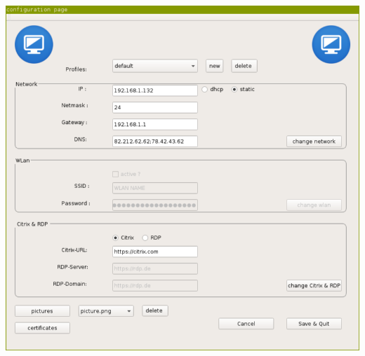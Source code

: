 \documentclass{beamer}
\begin{document}
	\begin{frame}
		\centering
		\includegraphics[scale=0.35]{ConfigPage}\\
	\end{frame}

\end{document}
